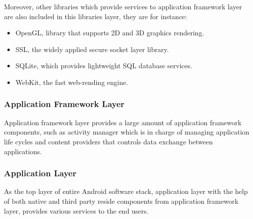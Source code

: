 Moreover, other libraries which provide services to application framework layer are also included in this libraries layer,  they are for instance:
\begin{itemize}
\item OpenGL, library that supports 2D and 3D graphics rendering.
\item SSL, the widely applied secure socket layer library.
\item  SQLite, which provides lightweight SQL database services.
\item  WebKit, the fast  web-rending engine.
\end{itemize}
\subsubsection{Application Framework Layer} Application framework layer provides a large amount of application framework components, such as activity manager which is in charge of managing application life cycles and content providers that controls data exchange between applications.
\subsubsection{Application  Layer}As the top layer of entire Android software stack, application layer with the help of both native and third party reside components from application framework layer, provides various services to the end users.

